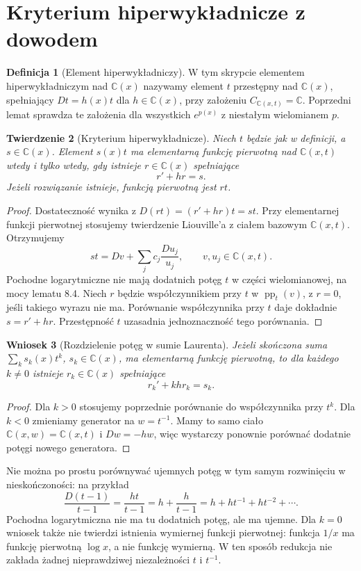 \documentclass[11pt,a4paper,oneside]{book}
\numberwithin{equation}{section}
\theoremstyle{plain}
\newtheorem{twierdzenie}{Twierdzenie}[chapter]
\newtheorem{wniosek}[twierdzenie]{Wniosek}
\theoremstyle{definition}
\newtheorem{definicja}[twierdzenie]{Definicja}
\theoremstyle{remark}
\newcommand{\C}{\mathbb{C}}
\begin{document}
\section{Kryterium hiperwykładnicze z dowodem}

\begin{definicja}[Element hiperwykładniczy]
W tym skrypcie elementem hiperwykładniczym nad $\C(x)$ nazywamy element $t$ przestępny nad $\C(x)$, spełniający $Dt=h(x)t$ dla $h\in\C(x)$, przy założeniu $C_{\C(x,t)}=\C$. Poprzedni lemat sprawdza te założenia dla wszystkich $e^{p(x)}$ z niestałym wielomianem $p$.
\end{definicja}

\begin{twierdzenie}[Kryterium hiperwykładnicze]
Niech $t$ będzie jak w definicji, a $s\in\C(x)$. Element $s(x)t$ ma elementarną funkcję pierwotną nad $\C(x,t)$ wtedy i tylko wtedy, gdy istnieje $r\in\C(x)$ spełniające
\begin{equation}\label{eq:hyperexp}
r'+hr=s.
\end{equation}
Jeżeli rozwiązanie istnieje, funkcją pierwotną jest $rt$.
\end{twierdzenie}
\begin{proof}
Dostateczność wynika z $D(rt)=(r'+hr)t=st$. Przy elementarnej funkcji pierwotnej stosujemy twierdzenie Liouville'a z ciałem bazowym $\C(x,t)$. Otrzymujemy
\[
st=Dv+\sum_j c_j\frac{Du_j}{u_j},\qquad v,u_j\in\C(x,t).
\]
Pochodne logarytmiczne nie mają dodatnich potęg $t$ w części wielomianowej, na mocy lematu 8.4. Niech $r$ będzie współczynnikiem przy $t$ w $\operatorname{pp}_t(v)$, z $r=0$, jeśli takiego wyrazu nie ma. Porównanie współczynnika przy $t$ daje dokładnie $s=r'+hr$. Przestępność $t$ uzasadnia jednoznaczność tego porównania.
\end{proof}

\begin{wniosek}[Rozdzielenie potęg w sumie Laurenta]
Jeżeli skończona suma $\sum_k s_k(x)t^k$, $s_k\in\C(x)$, ma elementarną funkcję pierwotną, to dla każdego $k\ne0$ istnieje $r_k\in\C(x)$ spełniające
\[
r_k'+khr_k=s_k.
\]
\end{wniosek}
\begin{proof}
Dla $k>0$ stosujemy poprzednie porównanie do współczynnika przy $t^k$. Dla $k<0$ zmieniamy generator na $w=t^{-1}$. Mamy to samo ciało $\C(x,w)=\C(x,t)$ i $Dw=-hw$, więc wystarczy ponownie porównać dodatnie potęgi nowego generatora.
\end{proof}

Nie można po prostu porównywać ujemnych potęg w tym samym rozwinięciu w nieskończoności: na przykład
\[
\frac{D(t-1)}{t-1}=\frac{ht}{t-1}
=h+\frac{h}{t-1}=h+ht^{-1}+ht^{-2}+\cdots.
\]
Pochodna logarytmiczna nie ma tu dodatnich potęg, ale ma ujemne. Dla $k=0$ wniosek także nie twierdzi istnienia wymiernej funkcji pierwotnej: funkcja $1/x$ ma funkcję pierwotną $\log x$, a nie funkcję wymierną. W ten sposób redukcja nie zakłada żadnej nieprawdziwej niezależności $t$ i $t^{-1}$.
\end{document}
